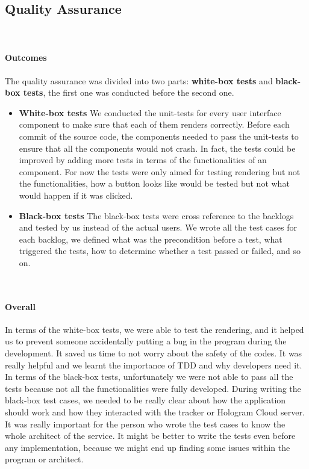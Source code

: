 \documentclass[12pt,a4paper]{article}
\begin{document}
      \subsection{Quality Assurance}
        \paragraph{Outcomes} The quality assurance was divided into two parts: {\bf white-box tests} and {\bf black-box tests}, the first one was conducted before the second one.
        \begin{itemize}
          \item {\bf White-box tests} We conducted the unit-tests for every user interface component to make sure that each of them renders correctly. Before each commit of the source code, the components needed to pass the unit-tests to ensure that all the components would not crash. In fact, the tests could be improved by adding more tests in terms of the functionalities of an component. For now the tests were only aimed for testing rendering but not the functionalities, how a button looks like would be tested but not what would happen if it was clicked. 
          \item {\bf Black-box tests} The black-box tests were cross reference to the backlogs and tested by us instead of the actual users. We wrote all the test cases for each backlog, we defined what was the precondition before a test, what triggered the tests, how to determine whether a test passed or failed, and so on.  
        \end{itemize}

        \paragraph{Overall} In terms of the white-box tests, we were able to test the rendering, and it helped us to prevent someone accidentally putting a bug in the program during the development. It saved us time to not worry about the safety of the codes. It was really helpful and we learnt the importance of TDD and why developers need it. In terms of the black-box tests, unfortunately we were not able to pass all the tests because not all the functionalities were fully developed. During writing the black-box test cases, we needed to be really clear about how the application should work and how they interacted with the tracker or Hologram Cloud server. It was really important for the person who wrote the test cases to know the whole architect of the service. It might be better to write the tests even before any implementation, because we might end up finding some issues within the program or architect.
\end{document}
